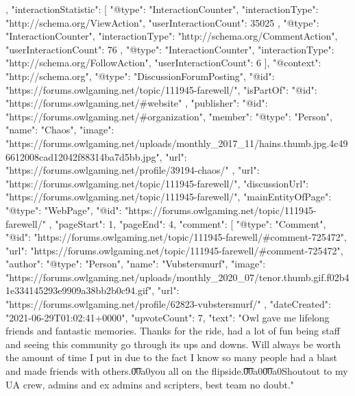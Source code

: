 {{    },
    "interactionStatistic": [
        {
            "@type": "InteractionCounter",
            "interactionType": "http://schema.org/ViewAction",
            "userInteractionCount": 35025
        },
        {
            "@type": "InteractionCounter",
            "interactionType": "http://schema.org/CommentAction",
            "userInteractionCount": 76
        },
        {
            "@type": "InteractionCounter",
            "interactionType": "http://schema.org/FollowAction",
            "userInteractionCount": 6
        }
    ],
    "@context": "http://schema.org",
    "@type": "DiscussionForumPosting",
    "@id": "https://forums.owlgaming.net/topic/111945-farewell/",
    "isPartOf": {
        "@id": "https://forums.owlgaming.net/#website"
    },
    "publisher": {
        "@id": "https://forums.owlgaming.net/#organization",
        "member": {
            "@type": "Person",
            "name": "Chaos",
            "image": "https://forums.owlgaming.net/uploads/monthly_2017_11/hains.thumb.jpg.4c496612008cad12042f88314ba7d5bb.jpg",
            "url": "https://forums.owlgaming.net/profile/39194-chaos/"
        }
    },
    "url": "https://forums.owlgaming.net/topic/111945-farewell/",
    "discussionUrl": "https://forums.owlgaming.net/topic/111945-farewell/",
    "mainEntityOfPage": {
        "@type": "WebPage",
        "@id": "https://forums.owlgaming.net/topic/111945-farewell/"
    },
    "pageStart": 1,
    "pageEnd": 4,
    "comment": [
        {
            "@type": "Comment",
            "@id": "https://forums.owlgaming.net/topic/111945-farewell/#comment-725472",
            "url": "https://forums.owlgaming.net/topic/111945-farewell/#comment-725472",
            "author": {
                "@type": "Person",
                "name": "Vubstersmurf",
                "image": "https://forums.owlgaming.net/uploads/monthly_2020_07/tenor.thumb.gif.f02b41e334145293e9909a38bb2b0c94.gif",
                "url": "https://forums.owlgaming.net/profile/62823-vubstersmurf/"
            },
            "dateCreated": "2021-06-29T01:02:41+0000",
            "upvoteCount": 7,
            "text": "Owl gave me lifelong friends and fantastic memories. Thanks for the ride, had a lot of fun being staff and seeing this community go through its ups and downs. Will always be worth the amount of time I put in due to the fact I know so many people had a blast and made friends with others.\n \n\n\n\t\u00a0\n \n\n\n\tCatch you all on the flipside.\n \n\n\n\t \n\n\n\t\u00a0\n \n\n\n\t\u00a0\n \n\n\n\tps Shoutout to my UA crew, admins and ex admins and scripters, best team no doubt.\n \n"
}}
